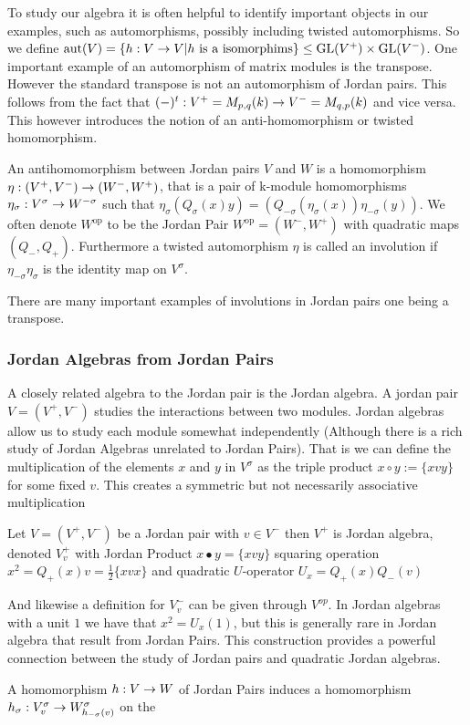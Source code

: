 To study our algebra it is often helpful to identify important objects in our examples, such as automorphisms, possibly including twisted automorphisms.
So we define 
$\text{aut}(V)=\{h:V\rightarrow V| h \text{ is a isomorphims}\}\leq \text{GL}(V^+)\times \text{GL}(V^-)$.  
One important example of an automorphism of matrix modules is the transpose. However the standard transpose is not an automorphism of Jordan pairs.
This follows from the fact that $(-)^t:V^+=M_{p,q}(k)\rightarrow V^-=M_{q,p}(k)$ and vice versa.
This however introduces the notion of an anti-homomorphism or twisted homomorphism.
\begin{definition}
    An antihomomorphism between Jordan pairs $V$ and $W$ is a homomorphism $\eta: (V^+,V^-)\rightarrow(W^-,W^+)$, that is a pair of k-module homomorphisms $\eta_\sigma:V^\sigma\rightarrow W^{-\sigma}$ such that
    $\eta_\sigma (Q_\sigma(x)y)=(Q_{-\sigma}(\eta_\sigma(x))\eta_{-\sigma} (y))$. We often denote $W^{\text{op}}$ to be the Jordan Pair $W^{\text{op}}=(W^-,W^+)$ with quadratic maps $(Q_-,Q_+)$.
    Furthermore a twisted automorphism $\eta$ is called an involution if $\eta_{-\sigma}\eta_\sigma$ is the identity map on $V^\sigma$.
\end{definition}
There are many important examples of involutions in Jordan pairs one being a transpose.

\subsubsection*{Jordan Algebras from Jordan Pairs}
A closely related algebra to the Jordan pair is the Jordan algebra. A jordan pair $V=(V^+,V^-)$ 
studies the interactions between two modules. Jordan algebras allow us to study each module somewhat independently (Although there is a rich study of Jordan Algebras unrelated to Jordan Pairs).
That is we can define the multiplication of the elements $x$ and $y$ in $V^\sigma$ as the triple 
product $x\circ y:=\{xvy\}$ for some fixed $v$. This creates a symmetric but not necessarily associative multiplication

\begin{definition}
    Let $V=(V^+,V^-)$ be a Jordan pair with $v\in V^-$ then $V^+$ is Jordan algebra, denoted $V^+_v$ with
    Jordan Product $x\bullet y=\{xvy\}$ squaring operation 
    $x^2=Q_+(x)v=\frac{1}{2}\{xvx\}$ and quadratic $U$-operator 
    $U_x=Q_+(x)Q_-(v)$
\end{definition}
And likewise a definition for $V^-_v$ can be given through $V^{op}$. 
In Jordan algebras with a unit $1$ we have that $x^2=U_x(1)$, but this is generally rare in Jordan algebra that result from Jordan Pairs.
This construction provides a powerful connection between the study of Jordan pairs and quadratic Jordan algebras.

A homomorphism $h:V\rightarrow W$ of Jordan Pairs induces a homomorphism $h_\sigma:V_v^\sigma\rightarrow W^\sigma_{h_{-\sigma}(v)}$ on the 
